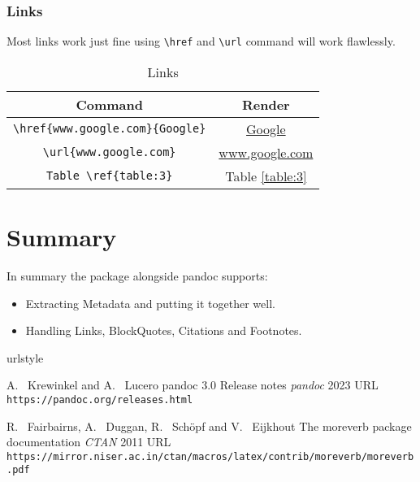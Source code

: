 \subsubsection{Links}
Most links work just fine using \verb|\href| and \verb|\url| command will work flawlessly.
\begin{table}[htbp]
\centering
\begin{tabular}{| c | c |}
 \hline
 Command & Render \\
 \hline
 \verb|\href{www.google.com}{Google}| & \href{www.google.com}{Google} \\ \hline
\verb|\url{www.google.com}| & \url{www.google.com}  \\ \hline
\verb|Table \ref{table:3}| & Table \ref{table:3}  \\ \hline
\end{tabular}
\caption{Links}
\label{table:4}
\end{table}

\section{Summary}
In summary the  package alongside pandoc supports:
\begin{itemize}
\item Extracting Metadata and putting it together well.
\item Handling Links, BlockQuotes, Citations and Footnotes.
\end{itemize}

\begin{thebibliography}{2}
    \providecommand{\natexlab}[1]{#1}
    \providecommand{\url}[1]{\texttt{#1}}
    \expandafter\ifx\csname urlstyle\endcsname\relax
      \providecommand{\doi}[1]{doi: #1}\else
      \providecommand{\doi}{doi: \begingroup \urlstyle{rm}\Url}\fi

A.~ Krewinkel and A.~ Lucero
\newblock pandoc 3.0 Release notes
\newblock \emph{pandoc}  2023
\newblock URL \url{https://pandoc.org/releases.html}

R.~ Fairbairns, A.~ Duggan, R.~ Schöpf and V.~ Eijkhout
\newblock The moreverb package documentation
\newblock \emph{CTAN}  2011
\newblock URL \url{https://mirror.niser.ac.in/ctan/macros/latex/contrib/moreverb/moreverb.pdf}

\end{thebibliography}


\address{%
Abhishek Ulayil\\
Institute of Actuaries of India (Student)\\%
Mumbai, India\\
ORCiD: 0009-0000-6935-8690\\
}
